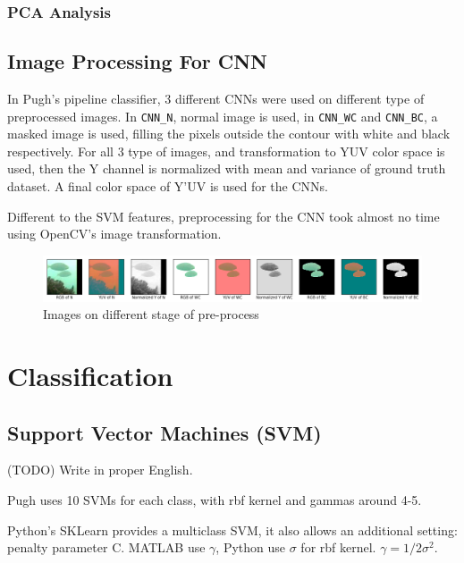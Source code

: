 \documentclass[bsc,logo,twoside,fullspacing,parskip]{infthesis}
\begin{document}
\subsection{PCA Analysis}


\section{Image Processing For CNN}

In Pugh's pipeline classifier, 3 different CNNs were used on different type of preprocessed images.
In  {\tt CNN\_N}, normal image is used, in {\tt CNN\_WC} and {\tt CNN\_BC}, a masked image is used, filling the pixels outside the contour with white and black respectively.
For all 3 type of images, and transformation to YUV color space is used, then the Y channel is normalized with mean and variance of ground truth dataset.
A final color space of Y'UV is used for the CNNs.

Different to the SVM features, preprocessing for the CNN took almost no time using OpenCV's image transformation.

\begin{figure}[h]
\centering
    \includegraphics[scale=0.4]{graph/imagepre.png}
    \caption{Images on different stage of pre-process}
    \label{fig:imageprepro}
\end{figure}

\chapter{Classification}

\section{Support Vector Machines (SVM)}

(TODO) Write in proper English.

Pugh uses 10 SVMs for each class, with rbf kernel and gammas around 4-5.

Python's SKLearn provides a multiclass SVM, 
it also allows an additional setting: penalty parameter C. MATLAB use \(\gamma\), Python use \(\sigma\) for rbf kernel. \( \gamma = 1/2\sigma^2 \).
\end{document}
